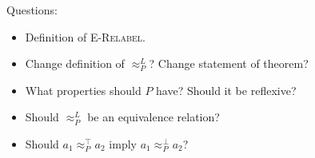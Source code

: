 \documentclass{article}
\theoremstyle{definition}
\begin{document}
\begin{flushleft}
  Questions:
\end{flushleft}

\begin{itemize}
\item Definition of \textsc{E-Relabel}.
\item Change definition of $\approx^{L}_{P}$? Change statement of theorem?
\item What properties should $P$ have? Should it be reflexive?
\item Should $\approx^{L}_{P}$ be an equivalence relation?
\item Should $a_1 \approx^{\top}_{P} a_2$ imply $a_1 \approx^{\bot}_{P} a_2$?
\end{itemize}
\end{document}
